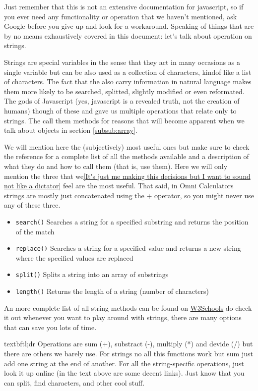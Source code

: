 Just remember that this is not an extensive documentation for javascript, so if you ever need any functionality or operation that we haven't mentioned, ask Google before you give up and look for a workaround. Speaking of things that are by no means exhaustively covered in this document: let's talk about operation on strings.

Strings are special variables in the sense that they act in many occasions as a single variable but can be also used as a collection of characters, kindof like a list of characters. The fact that the also carry information in natural language makes them more likely to be searched, splitted, slightly modified or even reformated. The gods of Javascript (yes, javascript is a revealed truth, not the creation of humans) though of these and gave us multiple operations that relate only to strings. The call them methods for reasons that will become apparent when we talk about objects in section \ref{subsub:array}.

We will mention here the (subjectively) most useful ones but make sure to check the reference for a complete list of all the methods available and a description of what they do and how to call them (that is, use them). Here we will only mention the three that we\ref{It's just me making this decisions but I want to sound not like a dictator} feel are the most useful. That said, in Omni Calculators strings are mostly just concatenated using the + operator, so you might never use any of these three.

\begin{itemize}
    \item \texttt{search()} Searches a string for a specified substring and returns the position of the match
    \item \texttt{replace()} Searches a string for a specified value and returns a new string where the specified values are replaced
    \item \texttt{split()} Splits a string into an array of substrings
    \item \texttt{length()} Returns the length of a string (number of characters)
\end{itemize}

An more complete list of all string methods can be found on \href{https://www.w3schools.com/jsref/jsref_obj_string.asp}{W3Schools} do check it out whenever you want to play around with strings, there are many options that can save you lots of time.

\large{textbf{tl;dr}}
Operations are sum (+), substract (-), multiply (*) and devide (/) but there are others we barely use. For strings no all this functions work but sum just add one string at the end of another. For all the string-specific operations, just look it up online (in the text above are some decent links). Just know that you can split, find characters, and other cool stuff.

